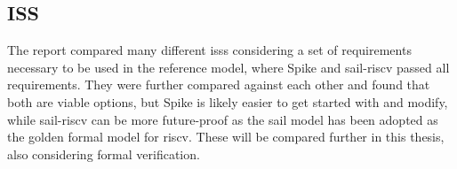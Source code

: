 \subsection{ISS}
\label{sec:pw_iss}

The report compared many different \acrshort{iss}s considering a set of requirements necessary to be used in the reference model, where Spike \cite{SpikeRISCVISA2023} and sail-riscv \cite{RISCVSailModel2023} passed all requirements. They were further compared against each other and found that both are viable options, but Spike is likely easier to get started with and modify, while sail-riscv can be more future-proof as the sail model has been adopted as the golden formal model for \acrshort{riscv}. These will be compared further in this thesis, also considering formal verification.




